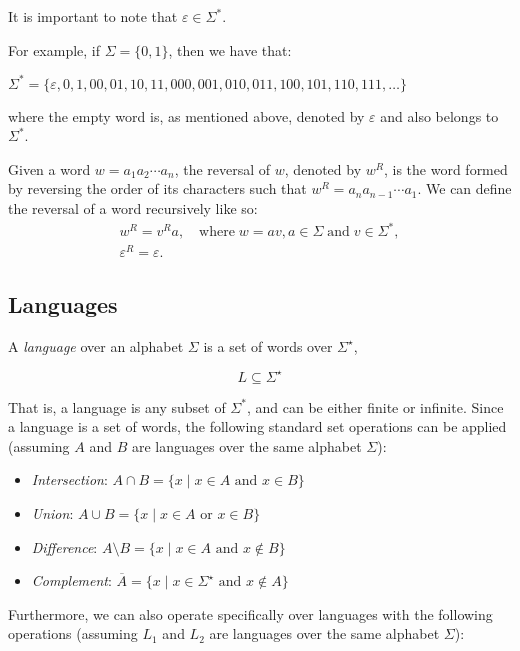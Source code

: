It is important to note that $\varepsilon \in \Sigma^*$.

For example, if $\Sigma = \{ 0, 1 \}$, then we have that:
\begin{center}
	$\Sigma^* = \{ \varepsilon, 0, 1, 00, 01, 10, 11, 000, 001, 010, 011, 100, 101, 110, 111, \ldots \}$
\end{center}

where the empty word is, as mentioned above, denoted by $\varepsilon$ and also belongs to $\Sigma^*$.


Given a word $w = a_1 a_2 \cdots a_n$, the reversal of $w$, denoted by $w^R$, is the word formed by reversing the order of its characters such that $w^R = a_n a_{n-1} \cdots a_1$. We can define the reversal of a word recursively like so:
\begin{gather*}
	w^R = v^Ra, \quad \text{where} \; w=av, a \in \Sigma \; \text{and} \; v \in \Sigma^*, \\
	\varepsilon^R = \varepsilon.
\end{gather*}

\subsection*{Languages}

A \emph{language} over an alphabet $\Sigma$ is a set of words over $\Sigma^\star$,

\[
L \subseteq \Sigma^\star
\]

That is, a language is any subset of $\Sigma^*$, and can be either finite or infinite. \newline
Since a language is a set of words, the following standard set operations can be applied (assuming $A$ and $B$ are languages over the same alphabet $\Sigma$):

\begin{itemize}
	\item \emph{Intersection}: $A \cap B = \{ x \mid x \in A \text{ and } x \in B \}$
	\item \emph{Union}: $A \cup B = \{ x \mid x \in A \text{ or } x \in B \}$
	\item \emph{Difference}: $A \setminus B = \{ x \mid x \in A \text{ and } x \notin B \}$
	\item \emph{Complement}: $\overline{A} = \{ x \mid x \in \Sigma^\star \text{ and } x \notin A \}$
\end{itemize}

Furthermore, we can also operate specifically over languages with the following operations (assuming $L_1$ and $L_2$ are languages over the same alphabet $\Sigma$):

